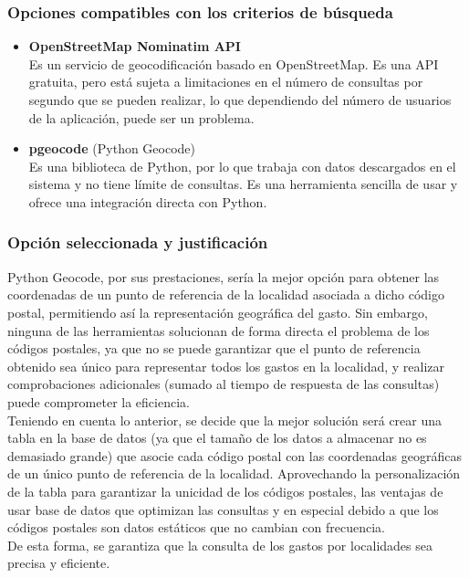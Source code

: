\subsubsection{Opciones compatibles con los criterios de búsqueda}
\begin{itemize}
    \item \textbf{OpenStreetMap Nominatim API}\\
    Es un servicio de geocodificación basado en OpenStreetMap. Es una API gratuita, pero está sujeta a limitaciones en el número de consultas por segundo que se pueden realizar, lo que dependiendo del número de usuarios de la aplicación, puede ser un problema.
    \item \textbf{pgeocode} (Python Geocode)\\
    Es una biblioteca de Python, por lo que trabaja con datos descargados en el sistema y no tiene límite de consultas. Es una herramienta sencilla de usar y ofrece una integración directa con Python.
\end{itemize}

\subsubsection{Opción seleccionada y justificación}\label{sec:justificacion_pgeocode}
Python Geocode, por sus prestaciones, sería la mejor opción para obtener las coordenadas de un punto de referencia de la localidad asociada a dicho código postal, permitiendo así la representación geográfica del gasto. Sin embargo, ninguna de las herramientas solucionan de forma directa el problema de los códigos postales, ya que no se puede garantizar que el punto de referencia obtenido sea único para representar todos los gastos en la localidad, y realizar comprobaciones adicionales (sumado al tiempo de respuesta de las consultas) puede comprometer la eficiencia.\\
Teniendo en cuenta lo anterior, se decide que la mejor solución será crear una tabla en la base de datos (ya que el tamaño de los datos a almacenar no es demasiado grande) que asocie cada código postal con las coordenadas geográficas de un único punto de referencia de la localidad. Aprovechando la personalización de la tabla para garantizar la unicidad de los códigos postales, las ventajas de usar base de datos que optimizan las consultas y en especial debido a que los códigos postales son datos estáticos que no cambian con frecuencia.\\
De esta forma, se garantiza que la consulta de los gastos por localidades sea precisa y eficiente.


